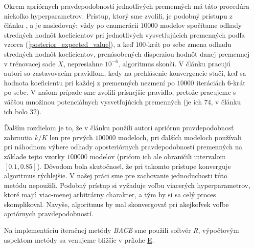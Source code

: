 Okrem apriórnych pravdepodobností jednotlivých premenných má táto procedúra niekoľko hyperparametrov.
Prístup, ktorý sme zvolili, je podobný prístupu z článku \cite{sala-i-martin}, a je nasledovný:
vždy po enumerácii \(10000\) modelov spočítame odhady stredných hodnôt koeficientov pri jednotlivých vysvetľujúcich premenných podľa vzorca (\ref{posterior_expected_value}),
a keď \(100\)-krát po sebe zmena odhadu stredných hodnôt koeficientov, prenásobených disperziou hodnôt danej premennej v trénovacej sade \(X\),
nepresiahne \(10^{-6}\), algoritmus skončí.
V článku \cite{sala-i-martin} pracujú autori so zastavovacím pravidlom, kedy na prehlásenie konvergencie stačí,
keď sa hodnota koeficientu pri každej z premenných nezmení po \(10000\) iteráciách \(6\)-krát po sebe.
V našom prípade sme zvolili prísnejšie pravidlo, pretože pracujeme s väčšou množinou potenciálnych vysvetľujúcich premenných
(je ich \(74\), v článku \cite{sala-i-martin} ich bolo \(32\)).

Ďalším rozdielom je to, že v článku \cite{sala-i-martin} použili autori apriórnu pravdepodobnosť zahrnutia \( \bar{k}/K \) len pre prvých \(100000\) modeloch,
pri ďalších modeloch používali pri náhodnom výbere odhady aposteriórnych pravdepodobností premenných na základe tejto vzorky \(100000\) modelov
(pričom ich ale ohraničili intervalom \([0.1, 0.85]\)).
Dôvodom bola skutočnosť, že pri takomto prístupe konverguje algoritmus rýchlejšie.
V našej práci sme pre zachovanie jednoduchosti túto metódu nepoužili.
Podobný prístup si vyžaduje voľbu viacerých hyperparametrov, ktoré majú viac-menej arbitrárny charakter, a tým by si sa celý proces skomplikoval.
Navyše, algoritmus by mal skonvergovať pri akejkoľvek voľbe apriórnych pravdepodobností.

Na implementáciu iteračnej metódy \emph{BACE} sme použili softvér \emph{R}, výpočtovým aspektom metódy sa venujeme bližšie v prílohe \hyperref[appendix:e]{E}.

